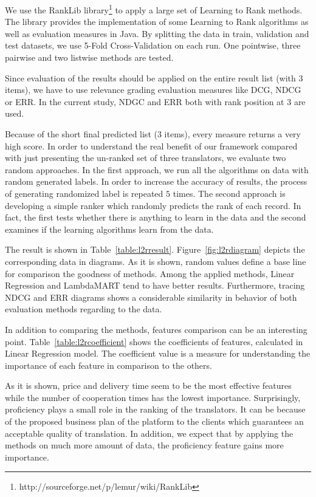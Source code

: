 We use the RankLib library\footnote{http://sourceforge.net/p/lemur/wiki/RankLib} to apply a large set of Learning to Rank methods. The library provides the  implementation of some Learning to Rank algorithms as well as evaluation measures in Java. By splitting the data in train, validation and test datasets, we use 5-Fold Cross-Validation on each run. One pointwise, three pairwise and two listwise methods are tested.

Since evaluation of the results should be applied on  the entire result list (with $3$ items), we have to use relevance grading evaluation measures like DCG, NDCG or ERR. In the current study, NDGC and ERR both with rank position at $3$ are used.

Because of the short final predicted list ($3$ items), every  measure returns a very high score. In order to understand the real benefit of our framework compared with just presenting the un-ranked set of three translators, we evaluate two random approaches. In the first approach, we run all the algorithms on data with random generated labels. In order to increase the accuracy of results, the process of generating randomized label is repeated $5$ times. The second approach is developing a simple ranker which randomly predicts the rank of each record. In fact, the first tests whether there is anything to learn in the data and the second examines if the learning algorithms learn from the data.

The result is shown in Table~\ref{table:l2rresult}.  Figure~\ref{fig:l2rdiagram} depicts the corresponding data in diagrams. As it is shown, random values define a base line for comparison the goodness of methods. Among the applied methods, Linear Regression and LambdaMART tend to have better results. Furthermore, tracing NDCG and ERR diagrams shows a considerable similarity in behavior of both evaluation methods regarding to the data.

In addition to comparing the methods, features comparison can be an interesting point. Table~\ref{table:l2rcoefficient} shows the coefficients of features, calculated in Linear Regression model. The coefficient value is a measure for understanding the importance of each feature in comparison to the others. 

As it is shown, price and delivery time seem to be the most effective features while the number of cooperation times has the lowest importance. Surprisingly, proficiency plays a small role in the ranking of the translators. It can be because of the proposed business plan of the platform to the clients which guarantees an acceptable quality of translation. In addition, we expect that by applying the methods on much more amount of data, the proficiency feature gains more importance.

